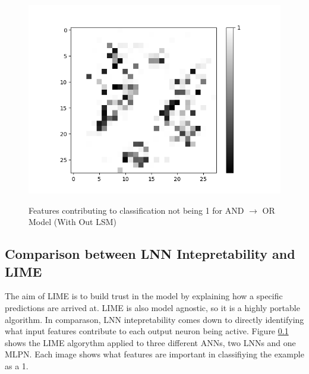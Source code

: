 \begin{minipage}[t]{0.45\textwidth}
\begin{figure}[H]
		\begin{minipage}[b]{0.5\textwidth}
			\captionsetup{labelformat=empty}
			\includegraphics[width=\textwidth]{AND-OR(W-LSM)(1)/Like/False/Layer0-Neuron-9.png}
			\label{}
		\end{minipage}
		\caption{Features contributing to classification not being 1 for AND $\rightarrow$ OR Model (With Out LSM)}
		\label{fig:and-or-lnn-with-lsm-like}
		\hfill
	\end{figure}
	
\end{minipage}

\subsection{Comparison between LNN Intepretability and LIME}
The aim of LIME is to build trust in the model by explaining how a specific predictions are arrived at. LIME is also model agnostic, so it is a highly portable algorithm.  In comparason, LNN intepretability comes down to directly identifying what input features contribute to each output neuron being active. Figure \ref{} shows the LIME algorythm applied to three different ANNs, two LNNs and one MLPN. Each image shows what features are important in classifiying the example as a 1.

